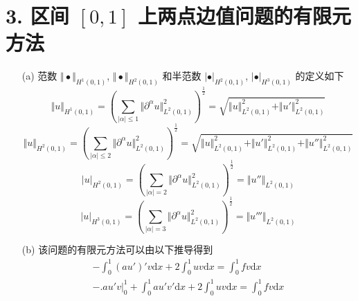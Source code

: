 \documentclass[a4paper]{article}
\begin{document}
\section*{3. 区间 $[0,1]$ 上两点边值问题的有限元方法}

\begin{enumerate}
    \item[(a)] 范数 $\Vert\bullet\Vert_{H^1(0,1)}$, $\Vert\bullet\Vert_{H^2(0,1)}$ 
                和半范数 $|\bullet|_{H^2(0,1)}$, $|\bullet|_{H^3(0,1)}$ 的定义如下
            \begin{equation}
                \Vert u \Vert_{H^1(0,1)}
                =\left(
                    \sum_{|\alpha|\leq 1} \Vert\partial^\alpha u\Vert^2_{L^2(0,1)}
                \right)^{\frac{1}{2}}
                =\sqrt{\Vert u\Vert^2_{L^2(0,1)}
                    +\Vert u'\Vert^2_{L^2(0,1)}}
            \end{equation}
            \begin{equation}
                \Vert u \Vert_{H^2(0,1)}
                =\left(
                    \sum_{|\alpha|\leq 2} \Vert\partial^\alpha u\Vert^2_{L^2(0,1)}
                \right)^{\frac{1}{2}}
                =\sqrt{\Vert u\Vert^2_{L^2(0,1)}
                    +\Vert u'\Vert^2_{L^2(0,1)}
                    +\Vert u''\Vert^2_{L^2(0,1)}}
            \end{equation}
            \begin{equation}
                |u|_{H^2(0,1)}
                =\left(
                    \sum_{|\alpha|= 2} \Vert\partial^\alpha u\Vert^2_{L^2(0,1)}
                \right)^{\frac{1}{2}}
                =\Vert u''\Vert_{L^2(0,1)}
            \end{equation}
            \begin{equation}
                |u|_{H^3(0,1)}
                =\left(
                    \sum_{|\alpha|= 3} \Vert\partial^\alpha u\Vert^2_{L^2(0,1)}
                \right)^{\frac{1}{2}}
                =\Vert u'''\Vert_{L^2(0,1)}
            \end{equation}
    \item[(b)] 该问题的有限元方法可以由以下推导得到
    \begin{equation}
        \begin{gathered}
            -\int_{0}^{1}(au')'v\text{d}x + 2\int_{0}^{1}uv\text{d}x = \int_{0}^{1}fv\text{d}x \\
            -\Big.au'v\Big|_0^1+\int_{0}^{1}au'v'\text{d}x + 2\int_{0}^{1}uv\text{d}x = \int_{0}^{1}fv\text{d}x \\

\end{gathered}
\end{equation}
\end{enumerate}
\end{document}
